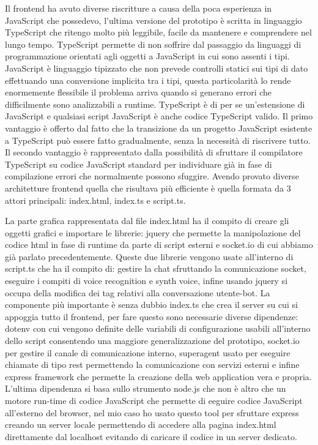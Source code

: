 Il frontend ha avuto diverse riscritture a causa della poca esperienza in JavaScript che possedevo, l'ultima versione del prototipo è scritta in linguaggio TypeScript che ritengo molto più leggibile, facile da mantenere e comprendere nel lungo tempo.
TypeScript permette di non soffrire dal passaggio da linguaggi di programmazione orientati agli oggetti a JavaScript in cui sono assenti i tipi. JavaScript è linguaggio tipizzato che non prevede controlli statici sui tipi di dato effettuando una conversione implicita tra i tipi, questa particolarità lo rende enormemente flessibile il problema arriva quando si generano errori che difficilmente sono analizzabili a runtime.
TypeScript è di per se un'estensione di JavaScript e qualsiasi script JavaScript è anche codice TypeScript valido. Il primo vantaggio è offerto dal fatto che la transizione da un progetto JavaScript esistente a TypeScript può essere fatto gradualmente, senza la necessità di riscrivere tutto. Il secondo vantaggio è rappresentato dalla possibilità di sfruttare il compilatore TypeScript su codice JavaScript standard per individuare già in fase di compilazione errori che normalmente possono sfuggire.
Avendo provato diverse architetture frontend quella che risultava più efficiente è quella formata da 3 attori principali: index.html, index.ts e script.ts.

La parte grafica rappresentata dal file index.html ha il compito di creare gli oggetti grafici e importare le librerie: jquery che permette la manipolazione del codice html in fase di runtime da parte di script esterni e socket.io di cui abbiamo già parlato precedentemente.
Queste due librerie vengono usate all'interno di script.ts che ha il compito di: gestire la chat sfruttando la comunicazione socket, eseguire i compiti di voice recognition e synth voice, infine usando jquery si occupa della modifica dei tag relativi alla conversazione utente-bot.
La componente più importante è senza dubbio index.ts che crea il server su cui si appoggia tutto il frontend, per fare questo sono necessarie diverse dipendenze: dotenv con cui vengono definite delle variabili di configurazione usabili all'interno dello script consentendo una maggiore generalizzazione del prototipo, socket.io per gestire il canale di comunicazione interno, superagent usato per eseguire chiamate di tipo rest permettendo la comunicazione con servizi esterni e infine express framework che permette la creazione della web application vera e propria.
L'ultima dipendenza si basa sullo strumento node.js che non è altro che un motore run-time di codice JavaScript che permette di eeguire codice JavaScript all'esterno del browser, nel mio caso ho usato questo tool per sfruttare express creando un server locale permettendo di accedere alla pagina index.html direttamente dal localhost evitando di caricare il codice in un server dedicato.
